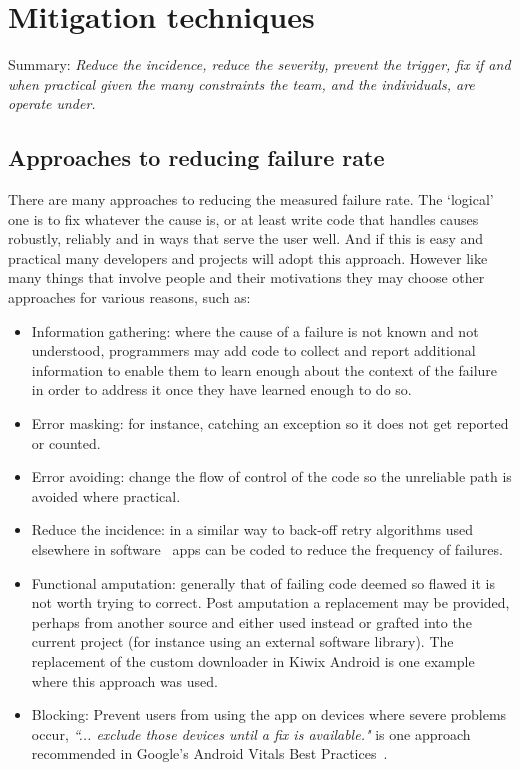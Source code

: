 \section{Mitigation techniques}
Summary: \textit{Reduce the incidence, reduce the severity, prevent the trigger, fix if and when practical given the many constraints the team, and the individuals,  are operate under.}

\subsection{Approaches to reducing failure rate}
There are many approaches to reducing the measured failure rate. The `logical' one is to fix whatever the cause is, or at least write code that handles causes robustly, reliably and in ways that serve the user well. And if this is easy and practical many developers and projects will adopt this approach. However like many things that involve people and their motivations they may choose other approaches for various reasons, such as:

\begin{itemize}
    \item Information gathering: where the cause of a failure is not known and not understood, programmers may add code to collect and report additional information to enable them to learn enough about the context of the failure in order to address it once they have learned enough to do so.
    \item Error masking: for instance, catching an exception so it does not get reported or counted.
    \item Error avoiding: change the flow of control of the code so the unreliable path is avoided where practical.
    \item Reduce the incidence: in a similar way to back-off retry algorithms used elsewhere in software~ apps can be coded to reduce the frequency of failures. 
    \item Functional amputation: generally that of failing code deemed so flawed it is not worth trying to correct. Post amputation a replacement may be provided, perhaps from another source and either used instead or grafted into the current project (for instance using an external software library). The replacement of the custom downloader in Kiwix Android is one example where this approach was used.
    \item Blocking: Prevent users from using the app on devices where severe problems occur, \emph{``... exclude those devices until a fix is available."} is one approach recommended in Google's Android Vitals Best Practices~\cite{android_vitals_best_practices}.
\end{itemize}
\afterpage{\clearpage}

